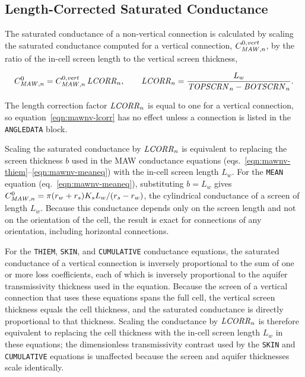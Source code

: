 \subsection{Length-Corrected Saturated Conductance}

The saturated conductance of a non-vertical connection is calculated by scaling the saturated conductance computed for a vertical connection, $C_{\mathit{MAW},n}^{0,\mathit{vert}}$, by the ratio of the in-cell screen length to the vertical screen thickness,

\begin{equation}
	\label{eqn:mawnv-lcorr}
	C_{\mathit{MAW},n}^{0} = C_{\mathit{MAW},n}^{0,\mathit{vert}} \, \mathit{LCORR}_n , \qquad
	\mathit{LCORR}_n = \frac{L_w}{\mathit{TOPSCRN}_n - \mathit{BOTSCRN}_n} .
\end{equation}

\noindent The length correction factor $\mathit{LCORR}_n$ is equal to one for a vertical connection, so equation~\ref{eqn:mawnv-lcorr} has no effect unless a connection is listed in the \texttt{ANGLEDATA} block.

Scaling the saturated conductance by $\mathit{LCORR}_n$ is equivalent to replacing the screen thickness $b$ used in the MAW conductance equations (eqs.~\ref{eqn:mawnv-thiem}--\ref{eqn:mawnv-meaneq}) with the in-cell screen length $L_w$. For the \texttt{MEAN} equation (eq.~\ref{eqn:mawnv-meaneq}), substituting $b = L_w$ gives $C^0_{\mathit{MAW},n} = \pi (r_w + r_s) K_s L_w / (r_s - r_w)$, the cylindrical conductance of a screen of length $L_w$. Because this conductance depends only on the screen length and not on the orientation of the cell, the result is exact for connections of any orientation, including horizontal connections.

For the \texttt{THIEM}, \texttt{SKIN}, and \texttt{CUMULATIVE} conductance equations, the saturated conductance of a vertical connection is inversely proportional to the sum of one or more loss coefficients, each of which is inversely proportional to the aquifer transmissivity thickness used in the equation. Because the screen of a vertical connection that uses these equations spans the full cell, the vertical screen thickness equals the cell thickness, and the saturated conductance is directly proportional to that thickness. Scaling the conductance by $\mathit{LCORR}_n$ is therefore equivalent to replacing the cell thickness with the in-cell screen length $L_w$ in these equations; the dimensionless transmissivity contrast used by the \texttt{SKIN} and \texttt{CUMULATIVE} equations is unaffected because the screen and aquifer thicknesses scale identically.

